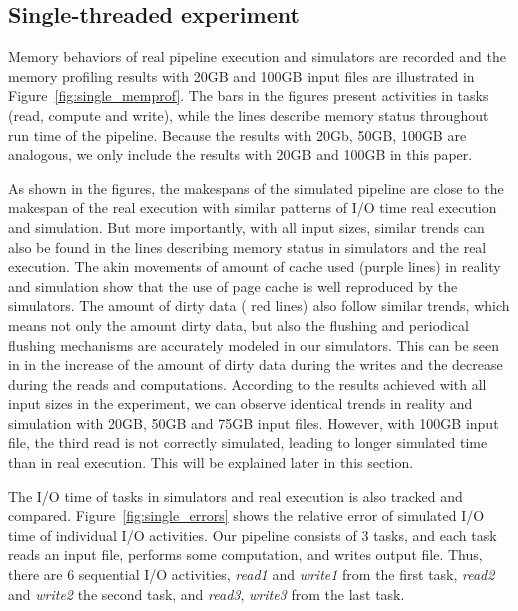 \documentclass[conference]{IEEEtran}
\begin{document}
		\subsection{Single-threaded experiment}

			Memory behaviors of real pipeline execution and simulators are recorded 
			and the memory profiling results with 20GB and 100GB input files 
			are illustrated in Figure~\ref{fig:single_memprof}. 
			The bars in the figures present activities in tasks (read, compute and write), 
			while the lines describe memory status throughout run time of the pipeline. 
			Because the results with 20Gb, 50GB, 100GB are analogous, we only include 
			the results with 20GB and 100GB in this paper. 
			
			As shown in the figures, the makespans of the simulated pipeline are 
			close to the makespan of the real execution with similar patterns of I/O time 
			real execution and simulation. 
			But more importantly, with all input sizes, similar trends can also be found 
			in the lines describing memory status in simulators and the real execution. 
			The akin movements of amount of cache used (purple lines) in reality 
			and simulation show that the use of page cache is well reproduced by the simulators. 
			The amount of dirty data ( red lines) also follow similar trends, 
			which means not only the amount dirty data, but also the flushing and 
			periodical flushing mechanisms are accurately modeled in our simulators. 
			This can be seen in in the increase of the amount of dirty data during the writes 
			and the decrease during the reads and computations. 
			According to the results achieved with all input sizes in the experiment, 
			we can observe identical trends in reality and simulation with 20GB, 
			50GB and 75GB input files. However, with 100GB input file, 
			the third read is not correctly simulated, leading to longer simulated time 
			than in real execution. This will be explained later in this section.
			
			The I/O time of tasks in simulators and real execution is also tracked and compared. 
			Figure~\ref{fig:single_errors} shows the relative error of simulated I/O time 
			of individual I/O activities. 
			Our pipeline consists of 3 tasks, and each task reads an input file, 
			performs some computation, and writes output file. 
			Thus, there are 6 sequential I/O activities, \textit{read1} and \textit{write1} 
			from the first task, \textit{read2} and \textit{write2} the second task, 
			and \textit{read3}, \textit{write3} from the last task.
			
\end{document}
